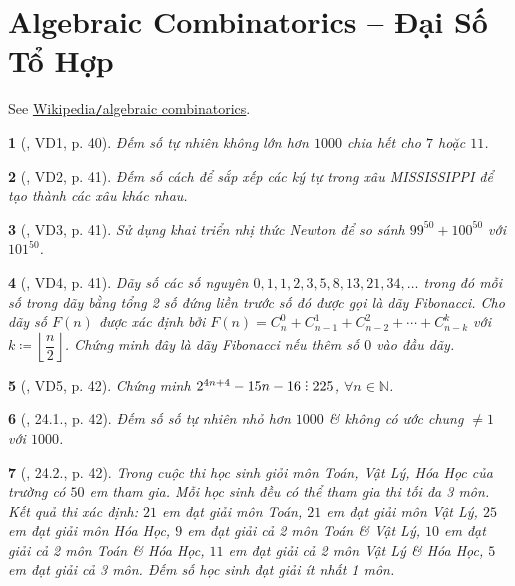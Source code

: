 \documentclass{article}
\newtheorem{baitoan}{}
\DeclareRobustCommand{\divby}{%
	\mathrel{\vbox{\baselineskip.65ex\lineskiplimit0pt\hbox{.}\hbox{.}\hbox{.}}}%
}
\begin{document}

\section{Algebraic Combinatorics -- Đại Số Tổ Hợp}
See \href{https://en.wikipedia.org/wiki/Algebraic_combinatorics}{Wikipedia{\tt/}algebraic combinatorics}.

\begin{baitoan}[\cite{Hai_Hung_Thu_Tung_ncpt_Toan_10_tap_2}, VD1, p. 40]
	Đếm số tự nhiên không lớn hơn $1000$ chia hết cho $7$ hoặc $11$.
\end{baitoan}

\begin{baitoan}[\cite{Hai_Hung_Thu_Tung_ncpt_Toan_10_tap_2}, VD2, p. 41]
	Đếm số cách để sắp xếp các ký tự trong xâu MISSISSIPPI để tạo thành các xâu khác nhau.
\end{baitoan}

\begin{baitoan}[\cite{Hai_Hung_Thu_Tung_ncpt_Toan_10_tap_2}, VD3, p. 41]
	Sử dụng khai triển nhị thức Newton để so sánh $99^{50} + 100^{50}$ với $101^{50}$.
\end{baitoan}

\begin{baitoan}[\cite{Hai_Hung_Thu_Tung_ncpt_Toan_10_tap_2}, VD4, p. 41]
	Dãy số các số nguyên $0,1,1,2,3,5,8,13,21,34,\ldots$ trong đó mỗi số trong dãy bằng tổng 2 số đứng liền trước số đó được gọi là {\rm dãy Fibonacci}. Cho dãy số $F(n)$ được xác định bởi $F(n) = C_n^0 + C_{n-1}^1 + C_{n-2}^2 + \cdots + C_{n-k}^k$ với $k\coloneqq\left\lfloor\dfrac{n}{2}\right\rfloor$. Chứng minh đây là dãy Fibonacci nếu thêm số $0$ vào đầu dãy.
\end{baitoan}

\begin{baitoan}[\cite{Hai_Hung_Thu_Tung_ncpt_Toan_10_tap_2}, VD5, p. 42]
	Chứng minh $2^{4n + 4} - 15n - 16\divby225$, $\forall n\in\mathbb{N}$.
\end{baitoan}

\begin{baitoan}[\cite{Hai_Hung_Thu_Tung_ncpt_Toan_10_tap_2}, 24.1., p. 42]
	Đếm số số tự nhiên nhỏ hơn $1000$ \& không có ước chung $\ne1$ với $1000$.
\end{baitoan}

\begin{baitoan}[\cite{Hai_Hung_Thu_Tung_ncpt_Toan_10_tap_2}, 24.2., p. 42]
	Trong cuộc thi học sinh giỏi môn Toán, Vật Lý, Hóa Học của trường có $50$ em tham gia. Mỗi học sinh đều có thể tham gia thi tối đa 3 môn. Kết quả thi xác định: $21$ em đạt giải môn Toán, $21$ em đạt giải môn Vật Lý, $25$ em đạt giải môn Hóa Học, $9$ em đạt giải cả 2 môn Toán \& Vật Lý, $10$ em đạt giải cả 2 môn Toán \& Hóa Học, $11$ em đạt giải cả 2 môn Vật Lý \& Hóa Học, $5$ em đạt giải cả 3 môn. Đếm số học sinh đạt giải ít nhất 1 môn.
\end{baitoan}
\end{document}

